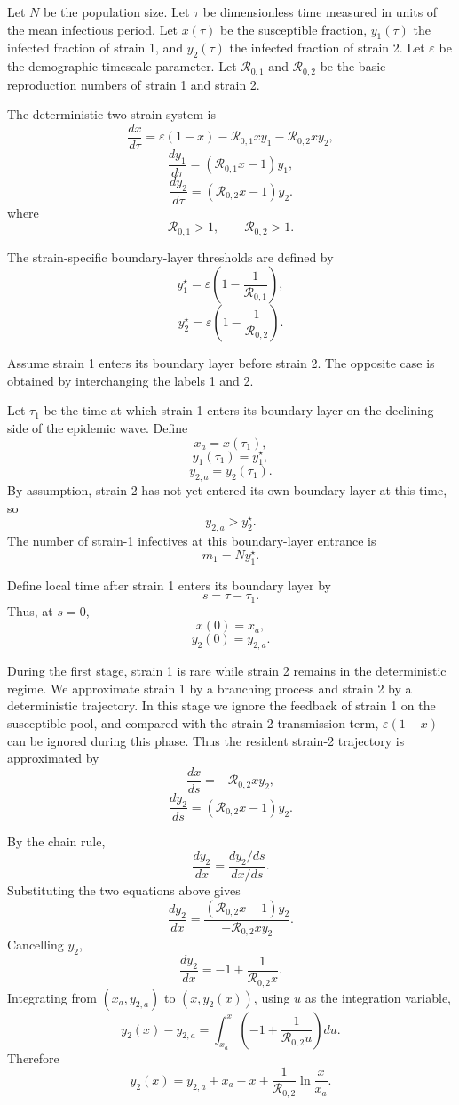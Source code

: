 \documentclass[11pt]{article}
\begin{document}
Let \(N\) be the population size. Let \(\tau\) be dimensionless time measured in units of the mean infectious period. Let \(x(\tau)\) be the susceptible fraction, \(y_1(\tau)\) the infected fraction of strain 1, and \(y_2(\tau)\) the infected fraction of strain 2. Let \(\varepsilon\) be the demographic timescale parameter. Let \(\mathcal R_{0,1}\) and \(\mathcal R_{0,2}\) be the basic reproduction numbers of strain 1 and strain 2.

The deterministic two-strain system is
\[
\frac{dx}{d\tau}
=
\varepsilon(1-x)-\mathcal R_{0,1}xy_1-\mathcal R_{0,2}xy_2,
\]
\[
\frac{dy_1}{d\tau}
=
(\mathcal R_{0,1}x-1)y_1,
\]
\[
\frac{dy_2}{d\tau}
=
(\mathcal R_{0,2}x-1)y_2.
\]
where
\[
\mathcal R_{0,1}>1,
\qquad
\mathcal R_{0,2}>1.
\]

The strain-specific boundary-layer thresholds are defined by
\[
y_1^\star
=
\varepsilon\left(1-\frac{1}{\mathcal R_{0,1}}\right),
\]
\[
y_2^\star
=
\varepsilon\left(1-\frac{1}{\mathcal R_{0,2}}\right).
\]

Assume strain 1 enters its boundary layer before strain 2. The opposite case is obtained by interchanging the labels 1 and 2.

Let \(\tau_1\) be the time at which strain 1 enters its boundary layer on the declining side of the epidemic wave. Define
\[
x_a=x(\tau_1),
\]
\[
y_1(\tau_1)=y_1^\star,
\]
\[
y_{2,a}=y_2(\tau_1).
\]
By assumption, strain 2 has not yet entered its own boundary layer at this time, so
\[
y_{2,a}>y_2^\star.
\]
The number of strain-1 infectives at this boundary-layer entrance is
\[
m_1=Ny_1^\star.
\]

Define local time after strain 1 enters its boundary layer by
\[
s=\tau-\tau_1.
\]
Thus, at \(s=0\),
\[
x(0)=x_a,
\]
\[
y_2(0)=y_{2,a}.
\]

During the first stage, strain 1 is rare while strain 2 remains in the deterministic regime. We approximate strain 1 by a branching process and strain 2 by a deterministic trajectory. In this stage we ignore the feedback of strain 1 on the susceptible pool, and compared with the strain-2 transmission term, $\varepsilon(1-x)$ can be ignored during this phase. Thus the resident strain-2 trajectory is approximated by
\[
\frac{dx}{ds}
=
-\mathcal R_{0,2}xy_2,
\]
\[
\frac{dy_2}{ds}
=
(\mathcal R_{0,2}x-1)y_2.
\]

By the chain rule,
\[
\frac{dy_2}{dx}
=
\frac{dy_2/ds}{dx/ds}.
\]
Substituting the two equations above gives
\[
\frac{dy_2}{dx}
=
\frac{(\mathcal R_{0,2}x-1)y_2}{-\mathcal R_{0,2}xy_2}.
\]
Cancelling \(y_2\),
\[
\frac{dy_2}{dx}
=
-1+\frac{1}{\mathcal R_{0,2}x}.
\]
Integrating from \((x_a,y_{2,a})\) to \((x,y_2(x))\), using \(u\) as the integration variable,
\[
y_2(x)-y_{2,a}
=
\int_{x_a}^{x}
\left(-1+\frac{1}{\mathcal R_{0,2}u}\right)du.
\]
Therefore
\[
y_2(x)
=
y_{2,a}+x_a-x+\frac{1}{\mathcal R_{0,2}}\ln\frac{x}{x_a}.
\]
\end{document}

